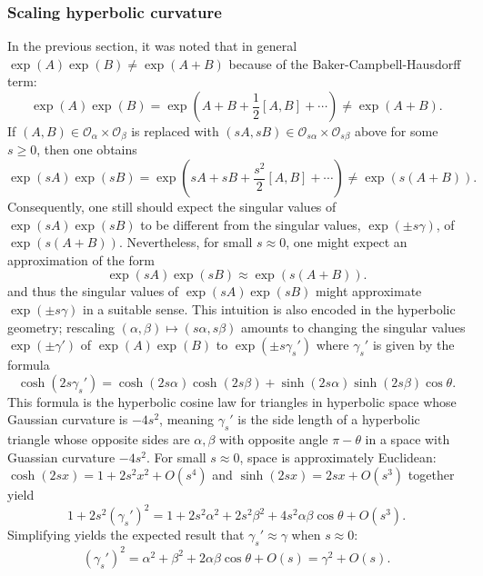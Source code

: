 \documentclass[notitlepage]{article}
\begin{document}
\subsubsection{Scaling hyperbolic curvature}

In the previous section, it was noted that in general $\exp(A)\exp(B) \neq \exp(A+B)$ because of the Baker-Campbell-Hausdorff term:
\begin{equation}
    \exp(A)\exp(B) = \exp(A+B+\frac{1}{2}[A,B]+\cdots) \neq \exp(A+B).
\end{equation}
If $(A, B) \in \mathcal O_{\alpha} \times \mathcal O_{\beta}$ is replaced with $(sA, sB) \in \mathcal O_{s\alpha} \times \mathcal O_{s \beta}$ above for some $s \geq 0$, then one obtains
\begin{equation}
    \exp(sA)\exp(sB) = \exp(sA+sB+\frac{s^2}{2}[A,B]+\cdots) \neq \exp(s(A+B)).
\end{equation}
Consequently, one still should expect the singular values of $\exp(sA)\exp(sB)$ to be different from the singular values, $\exp(\pm s \gamma)$, of $\exp(s(A+B))$.
Nevertheless, for small $s \approx 0$, one might expect an approximation of the form
\begin{equation}
    \exp(sA)\exp(sB) \approx \exp(s(A+B)).
\end{equation}
and thus the singular values of $\exp(sA)\exp(sB)$ might approximate $\exp(\pm s \gamma)$ in a suitable sense.
This intuition is also encoded in the hyperbolic geometry; rescaling $(\alpha,\beta)\mapsto (s\alpha, s\beta)$ amounts to changing the singular values $\exp(\pm \gamma')$ of $\exp(A)\exp(B)$ to $\exp(\pm s \gamma_s')$ where $\gamma_s'$ is given by the formula
\begin{equation}
    \cosh(2 s \gamma_s') = \cosh(2 s\alpha) \cosh(2 s\beta) + \sinh (2s\alpha) \sinh (2s\beta)\cos \theta.
\end{equation}
This formula is the hyperbolic cosine law for triangles in hyperbolic space whose Gaussian curvature is $-4s^2$, meaning $\gamma_s'$ is the side length of a hyperbolic triangle whose opposite sides are $\alpha,\beta$ with opposite angle $\pi-\theta$ in a space with Guassian curvature $-4s^2$.
For small $s\approx 0$, space is approximately Euclidean: $\cosh(2sx) = 1 + 2s^2x^2 + O(s^4)$ and $\sinh(2sx) = 2sx + O(s^3)$ together yield 
\begin{equation}
    1 + 2 s^2 (\gamma_s')^2 = 1 + 2 s^2 \alpha^2 + 2 s^2 \beta^2 + 4 s^2 \alpha \beta \cos \theta + O(s^3).
\end{equation}
Simplifying yields the expected result that $\gamma_s' \approx \gamma$ when $s \approx 0$:
\begin{equation}
    (\gamma_s')^2 = \alpha^2 + \beta^2 + 2 \alpha \beta \cos \theta + O(s) = \gamma^2 + O(s).
\end{equation}
\end{document}

